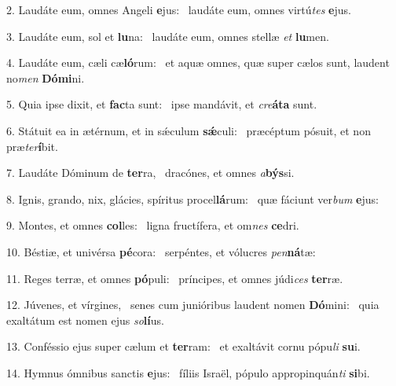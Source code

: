 2. Laudáte eum, omnes Angeli \textbf{e}jus: \ast\  laudáte eum, omnes virtú\textit{tes} \textbf{e}jus.\

3. Laudáte eum, sol et \textbf{lu}na: \ast\  laudáte eum, omnes stellæ \textit{et} \textbf{lu}men.\

4. Laudáte eum, cæli cæ\textbf{ló}rum: \ast\  et aquæ omnes, quæ super cælos sunt, laudent no\textit{men} \textbf{Dó}\textbf{mi}ni.\

5. Quia ipse dixit, et \textbf{fac}ta sunt: \ast\  ipse mandávit, et \textit{cre}\textbf{á}\textbf{ta} sunt.\

6. Státuit ea in ætérnum, et in sǽculum \textbf{sǽ}culi: \ast\  præcéptum pósuit, et non præ\textit{ter}\textbf{í}bit.\

7. Laudáte Dóminum de \textbf{ter}ra, \ast\  dracónes, et omnes \textit{a}\textbf{býs}si.\

8. Ignis, grando, nix, glácies, spíritus procel\textbf{lá}rum: \ast\  quæ fáciunt ver\textit{bum} \textbf{e}jus:\

9. Montes, et omnes \textbf{col}les: \ast\  ligna fructífera, et om\textit{nes} \textbf{ce}dri.\

10. Béstiæ, et univérsa \textbf{pé}cora: \ast\  serpéntes, et vólucres \textit{pen}\textbf{ná}tæ:\

11. Reges terræ, et omnes \textbf{pó}puli: \ast\  príncipes, et omnes júdi\textit{ces} \textbf{ter}ræ.\

12. Júvenes, et vírgines, \dag\  senes cum junióribus laudent nomen \textbf{Dó}mini: \ast\  quia exaltátum est nomen ejus \textit{so}\textbf{lí}us.\

13. Conféssio ejus super cælum et \textbf{ter}ram: \ast\  et exaltávit cornu pópu\textit{li} \textbf{su}i.\

14. Hymnus ómnibus sanctis \textbf{e}jus: \ast\  fíliis Israël, pópulo appropinquán\textit{ti} \textbf{si}bi.\

